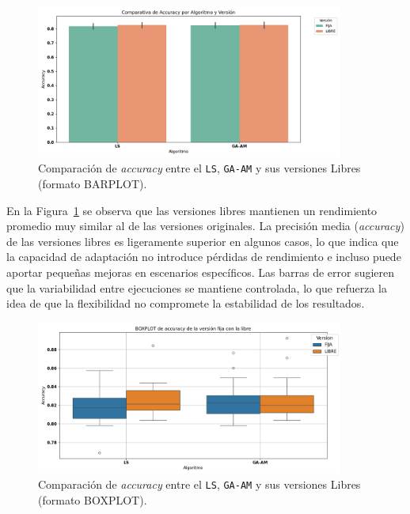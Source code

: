 \begin{figure}[htp]
    \centering
    \includegraphics[width=0.9\textwidth]{imagenes/evaluaciones/libres/barplot_por_algoritmo.png}
    \caption{Comparación de \textit{accuracy} entre el \texttt{LS}, \texttt{GA-AM} y sus versiones Libres (formato BARPLOT).}
    \label{fig:barplot_por_algoritmo-libres}
\end{figure}

En la Figura~\ref{fig:barplot_por_algoritmo-libres} se observa que las versiones libres mantienen un rendimiento promedio muy similar al de las versiones originales.
La precisión media (\textit{accuracy}) de las versiones libres es ligeramente superior en algunos casos,
lo que indica que la capacidad de adaptación no introduce pérdidas de rendimiento e incluso puede aportar pequeñas mejoras en escenarios específicos.
Las barras de error sugieren que la variabilidad entre ejecuciones se mantiene controlada,
lo que refuerza la idea de que la flexibilidad no compromete la estabilidad de los resultados.


\begin{figure}[htp]
    \centering
    \includegraphics[width=0.9\textwidth]{imagenes/evaluaciones/libres/boxplot_por_algoritmo.png}
    \caption{Comparación de \textit{accuracy} entre el \texttt{LS}, \texttt{GA-AM} y sus versiones Libres (formato BOXPLOT).}
    \label{fig:boxplot_por_algoritmo-libres}
\end{figure}

